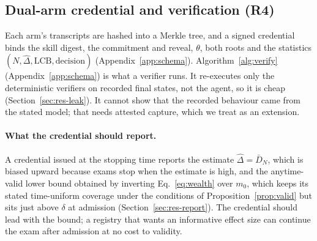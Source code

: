 \subsection{Dual-arm credential and verification (R4)}
Each arm's transcripts are hashed into a Merkle tree, and a signed credential binds the skill digest, the commitment and reveal, $\theta$, both roots and the statistics $(N,\hat\Delta,\mathrm{LCB},\text{decision})$ (Appendix~\ref{app:schema}). Algorithm~\ref{alg:verify} (Appendix~\ref{app:schema}) is what a verifier runs. It re-executes only the deterministic verifiers on recorded final states, not the agent, so it is cheap (Section~\ref{sec:res-leak}). It cannot show that the recorded behaviour came from the stated model; that needs attested capture, which we treat as an extension.



\paragraph{What the credential should report.} A credential issued at the stopping time reports the estimate $\hat\Delta=\bar D_N$, which is biased upward because exams stop when the estimate is high, and the anytime-valid lower bound obtained by inverting Eq.~\eqref{eq:wealth} over $m_0$, which keeps its stated time-uniform coverage under the conditions of Proposition~\ref{prop:valid} but sits just above $\delta$ at admission (Section~\ref{sec:res-report}). The credential should lead with the bound; a registry that wants an informative effect size can continue the exam after admission at no cost to validity.

